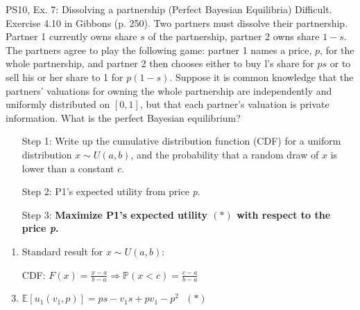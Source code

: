 \begin{frame}{PS10, Ex. 7: Dissolving a partnership (Perfect Bayesian Equilibria)}
    Difficult. Exercise 4.10 in Gibbons (p. 250). Two partners must dissolve their partnership. Partner 1 currently owns share $s$ of the partnership, partner 2 owns share $1-s$. The partners agree to play the following game: partner 1 names a price, $p$, for the whole partnership, and partner 2 then chooses either to buy l's share for $ps$ or to sell his or her share to 1 for $p(1-s)$. Suppose it is common knowledge that the partners' valuations for owning the whole partnership are independently and uniformly distributed on $[0,1]$, but that each partner's valuation is private information. What is the perfect Bayesian equilibrium?\vspace{-11pt}
    \begin{multicols}{2}
      \begin{itemize}
        \item[Step 1:] Write up the cumulative distribution function (CDF) for a uniform distribution $x\sim U(a, b)$, and the probability that a random draw of $x$ is lower than a constant $c$.
        \item[Step 2:] P1's expected utility from price \textit{p}.
        \item[Step 3:] \textbf{Maximize P1's expected utility $(*)$ with respect to the price \textit{p}.}
      \end{itemize}\vspace{-8pt}
      \vfill\null\columnbreak
      \begin{enumerate}
        \item Standard result for $x\sim U(a, b):$
        \item[CDF:] $F(x)=\frac{x-a}{b-a}\Rightarrow\mathbb{P}(x<c)=\frac{c-a}{b-a}$
        \item $\mathbb{E}[u_1(v_1,p)]=ps-v_1s+pv_1-p^2\ \ \ (*)$
      \end{enumerate}
      \vfill\null
    \end{multicols}
\end{frame}
